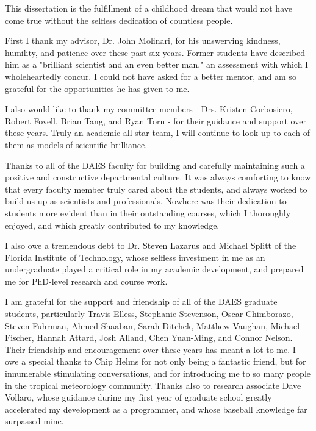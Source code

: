  


\indent \indent This dissertation is the fulfillment of a childhood dream that would not have come true without the selfless dedication of countless people.

First I thank my advisor, Dr. John Molinari, for his unswerving kindness, humility, and patience over these past six years.  
Former students have described him as a "brilliant scientist and an even better man," an assessment with which I wholeheartedly concur.  
I could not have asked for a better mentor, and am so grateful for the opportunities he has given to me.

I also would like to thank my committee members - Drs. Kristen Corbosiero, Robert Fovell, Brian Tang, and Ryan Torn - for their guidance and support over these years.  
Truly an academic all-star team, I will continue to look up to each of them as models of scientific brilliance.

Thanks to all of the DAES faculty for building and carefully maintaining such a positive and constructive departmental culture.  
It was always comforting to know that every faculty member truly cared about the students, and always worked to build us up as scientists and professionals.  
Nowhere was their dedication to students more evident than in their outstanding courses, which I thoroughly enjoyed, and which greatly contributed to my knowledge.  

I also owe a tremendous debt to Dr. Steven Lazarus and Michael Splitt of the Florida Institute of Technology, whose selfless investment in me as an undergraduate played a critical role in my academic development, and prepared me for PhD-level research and course work.

I am grateful for the support and friendship of all of the DAES graduate students, particularly Travis Elless, Stephanie Stevenson, Oscar Chimborazo, Steven Fuhrman, Ahmed Shaaban, Sarah Ditchek, Matthew Vaughan, Michael Fischer, Hannah Attard, Josh Alland, Chen Yuan-Ming, and Connor Nelson.  
Their friendship and encouragement over these years has meant a lot to me.
I owe a special thanks to Chip Helms for not only being a fantastic friend, but for innumerable stimulating conversations, and for introducing me to so many people in the tropical meteorology community.  
Thanks also to research associate Dave Vollaro, whose guidance during my first year of graduate school greatly accelerated my development as a programmer, and whose baseball knowledge far surpassed mine.

